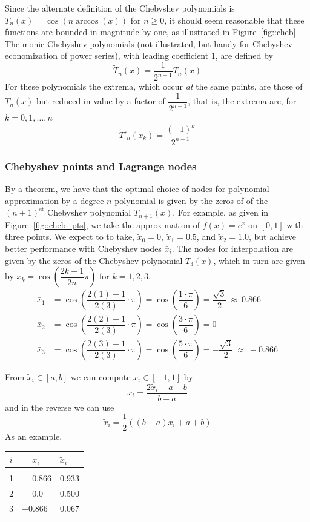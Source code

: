 \documentclass[11pt]{article}
\begin{document}
Since the alternate definition of the Chebyshev polynomials is \(T_n(x) = \cos(n\arccos(x))\) for \(n\geq0\), it should seem reasonable that these functions are bounded in magnitude by one, as illustrated in Figure~\ref{fig::cheb}. The monic Chebyshev polynomials (not illustrated, but handy for Chebyshev economization of power series), with leading coefficient \(1\), are defined by \[\tilde T_n(x) = \dfrac{1}{2^{n-1}}T_n(x)\] For these polynomials the extrema, which occur \textit{at} the same points, are those of \(T_n(x)\) but reduced in value by a factor of \(\dfrac{1}{2^{n-1}}\), that is, the extrema are, for \(k=0, 1, \dots, n\) \[\tilde T'_n(\bar x_k) = \dfrac{(-1)^k}{2^{n-1}}\]


\subsubsection{Chebyshev points and Lagrange nodes}
By a theorem, we have that the optimal choice of nodes for polynomial approximation by a degree \(n\) polynomial is given by the zeros of of the \((n+1)^\text{st}\) Chebyshev polynomial \(T_{n+1}(x)\). For example, as given in Figure~\ref{fig::cheb_pts}, we take the approximation of \(f(x) = e^x\) on \([0, 1]\) with three points. We expect to to take, \(\tilde x_0 = 0\), \(\tilde x_1 = 0.5\), and \(\tilde x_2 = 1.0\), but achieve better performance with Chebyshev nodes \(\bar x_i\). The nodes for interpolation are given by the zeros of the Chebyshev polynomial \(T_3(x)\), which in turn are given by \(\bar x_k = \cos\left(\dfrac{2k-1}{2n}\pi\right)\) for \(k=1, 2, 3\).
\begin{align*}
\bar x_1 &= \cos\left(\dfrac{2(1)-1}{2(3)}\cdot\pi\right) = \cos\left(\dfrac{1\cdot\pi}{6}\right)= \dfrac{\sqrt{3}}{2} ~\approx~ 0.866\\
\bar x_2 &= \cos\left(\dfrac{2(2)-1}{2(3)}\cdot\pi\right) = \cos\left(\dfrac{3\cdot\pi}{6}\right)= 0\\
\bar x_3 &= \cos\left(\dfrac{2(3)-1}{2(3)}\cdot\pi\right) = \cos\left(\dfrac{5\cdot\pi}{6}\right)= -\dfrac{\sqrt{3}}{2} ~\approx~ -0.866 
\end{align*}

From \(\tilde x_i \in [a,b]\) we can compute \(\bar x_i \in [-1, 1]\) by \[x_i = \dfrac{2\tilde x_i - a - b}{b-a}\] and in the reverse we can use \[\tilde x_i = \dfrac{1}{2}\left((b-a)\bar x_i + a + b\right)\] As an example,
\begin{center}
\begin{tabular}{cll}
\(i\) & \(\phantom{-}\bar x_i\) & \(\tilde x_i\)\\
\hline \hline
& & \\[-10pt]
1 & \(\phantom{-}0.866\) & 0.933\\ 
2 & \(\phantom{-}0.0\) & 0.500 \\
3 & \(-0.866\) & 0.067
\end{tabular}
\end{center}
\end{document}
